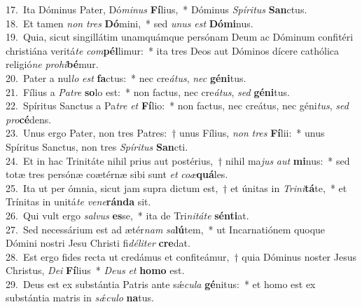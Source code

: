 {17.~}Ita Dóminus Pater, Dó\textit{mi}\textit{nus} \textbf{Fí}lius,~* Dóminus \textit{Spí}\textit{ri}\textit{tus} \textbf{San}ctus.\\
{18.~}Et tamen \textit{non} \textit{tres} \textbf{Dó}mini,~* sed \textit{u}\textit{nus} \textit{est} \textbf{Dó}\textbf{mi}nus.\\
{19.~}Quia, sicut singillátim unamquámque persónam Deum ac Dóminum confitéri christiána veritá\textit{te} \textit{com}\textbf{pél}limur:~* ita tres Deos aut Dóminos dícere cathólica religió\textit{ne} \textit{pro}\textit{hi}\textbf{bé}mur.\\
{20.~}Pater a nul\textit{lo} \textit{est} \textbf{fa}ctus:~* nec cre\textit{á}\textit{tus}, \textit{nec} \textbf{gé}\textbf{ni}tus.\\
{21.~}Fílius a \textit{Pa}\textit{tre} \textbf{so}lo est:~* non factus, nec cre\textit{á}\textit{tus}, \textit{sed} \textbf{gé}\textbf{ni}tus.\\
{22.~}Spíritus Sanctus a Pa\textit{tre} \textit{et} \textbf{Fí}lio:~* non factus, nec creátus, nec géni\textit{tus}, \textit{sed} \textit{pro}\textbf{cé}dens.\\
{23.~}Unus ergo Pater, non tres Patres:~† unus Fílius, \textit{non} \textit{tres} \textbf{Fí}lii:~* unus Spíritus Sanctus, non tres \textit{Spí}\textit{ri}\textit{tus} \textbf{San}cti.\\
{24.~}Et in hac Trinitáte nihil prius aut postérius,~† nihil ma\textit{jus} \textit{aut} \textbf{mi}nus:~* sed totæ tres persónæ coætérnæ sibi sunt \textit{et} \textit{co}\textit{æ}\textbf{quá}les.\\
{25.~}Ita ut per ómnia, sicut jam supra dictum est,~† et únitas in \textit{Tri}\textit{ni}\textbf{tá}te,~* et Trínitas in unitá\textit{te} \textit{ve}\textit{ne}\textbf{rán}\textbf{da} sit.\\
{26.~}Qui vult ergo \textit{sal}\textit{vus} \textbf{es}se,~* ita de Tri\textit{ni}\textit{tá}\textit{te} \textbf{sén}\textbf{ti}at.\\
{27.~}Sed necessárium est ad ætér\textit{nam} \textit{sa}\textbf{lú}tem,~* ut Incarnatiónem quoque Dómini nostri Jesu Christi fi\textit{dé}\textit{li}\textit{ter} \textbf{cre}dat.\\
{28.~}Est ergo fides recta ut credámus et confiteámur,~† quia Dóminus noster Jesus Christus, \textit{De}\textit{i} \textbf{Fí}lius~* \textit{De}\textit{us} \textit{et} \textbf{ho}\textbf{mo} est.\\
{29.~}Deus est ex substántia Patris ante sǽ\textit{cu}\textit{la} \textbf{gé}nitus:~* et homo est ex substántia matris in \textit{sǽ}\textit{cu}\textit{lo} \textbf{na}tus.\\
